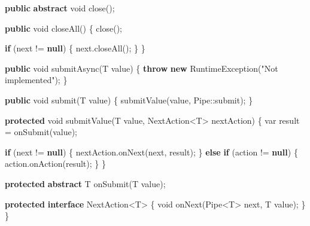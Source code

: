 \documentclass[11pt]{article}
\newenvironment{Shaded}{}{}
\newcommand{\KeywordTok}[1]{\textcolor[rgb]{0.00,0.44,0.13}{\textbf{{#1}}}}
\newcommand{\DataTypeTok}[1]{\textcolor[rgb]{0.56,0.13,0.00}{{#1}}}
\newcommand{\StringTok}[1]{\textcolor[rgb]{0.25,0.44,0.63}{{#1}}}
\newcommand{\FunctionTok}[1]{\textcolor[rgb]{0.02,0.16,0.49}{{#1}}}
\newcommand{\NormalTok}[1]{{#1}}
\newcommand{\ControlFlowTok}[1]{\textcolor[rgb]{0.00,0.44,0.13}{\textbf{{#1}}}}
\newcommand{\OperatorTok}[1]{\textcolor[rgb]{0.40,0.40,0.40}{{#1}}}
\newcommand{\BuiltInTok}[1]{{#1}}
\begin{document}
\begin{Shaded}
\begin{Highlighting}[]
    \KeywordTok{public} \KeywordTok{abstract} \DataTypeTok{void} \FunctionTok{close}\OperatorTok{();}

    \KeywordTok{public} \DataTypeTok{void} \FunctionTok{closeAll}\OperatorTok{()} \OperatorTok{\{}
        \FunctionTok{close}\OperatorTok{();}

        \ControlFlowTok{if} \OperatorTok{(}\NormalTok{next }\OperatorTok{!=} \KeywordTok{null}\OperatorTok{)} \OperatorTok{\{}
\NormalTok{            next}\OperatorTok{.}\FunctionTok{closeAll}\OperatorTok{();}
        \OperatorTok{\}}
    \OperatorTok{\}}

    \KeywordTok{public} \DataTypeTok{void} \FunctionTok{submitAsync}\OperatorTok{(}\NormalTok{T value}\OperatorTok{)} \OperatorTok{\{}
        \ControlFlowTok{throw} \KeywordTok{new} \BuiltInTok{RuntimeException}\OperatorTok{(}\StringTok{"Not implemented"}\OperatorTok{);}
    \OperatorTok{\}}

    \KeywordTok{public} \DataTypeTok{void} \FunctionTok{submit}\OperatorTok{(}\NormalTok{T value}\OperatorTok{)} \OperatorTok{\{}
        \FunctionTok{submitValue}\OperatorTok{(}\NormalTok{value}\OperatorTok{,} \BuiltInTok{Pipe}\OperatorTok{::}\NormalTok{submit}\OperatorTok{);}
    \OperatorTok{\}}

    \KeywordTok{protected} \DataTypeTok{void} \FunctionTok{submitValue}\OperatorTok{(}\NormalTok{T value}\OperatorTok{,}\NormalTok{ NextAction}\OperatorTok{\textless{}}\NormalTok{T}\OperatorTok{\textgreater{}}\NormalTok{ nextAction}\OperatorTok{)} \OperatorTok{\{}
        \DataTypeTok{var}\NormalTok{ result }\OperatorTok{=} \FunctionTok{onSubmit}\OperatorTok{(}\NormalTok{value}\OperatorTok{);}

        \ControlFlowTok{if} \OperatorTok{(}\NormalTok{next }\OperatorTok{!=} \KeywordTok{null}\OperatorTok{)} \OperatorTok{\{}
\NormalTok{            nextAction}\OperatorTok{.}\FunctionTok{onNext}\OperatorTok{(}\NormalTok{next}\OperatorTok{,}\NormalTok{ result}\OperatorTok{);}
        \OperatorTok{\}} \ControlFlowTok{else} \ControlFlowTok{if} \OperatorTok{(}\NormalTok{action }\OperatorTok{!=} \KeywordTok{null}\OperatorTok{)} \OperatorTok{\{}
\NormalTok{            action}\OperatorTok{.}\FunctionTok{onAction}\OperatorTok{(}\NormalTok{result}\OperatorTok{);}
        \OperatorTok{\}}
    \OperatorTok{\}}

    \KeywordTok{protected} \KeywordTok{abstract}\NormalTok{ T }\FunctionTok{onSubmit}\OperatorTok{(}\NormalTok{T value}\OperatorTok{);}

    \KeywordTok{protected} \KeywordTok{interface}\NormalTok{ NextAction}\OperatorTok{\textless{}}\NormalTok{T}\OperatorTok{\textgreater{}} \OperatorTok{\{}
        \DataTypeTok{void} \FunctionTok{onNext}\OperatorTok{(}\BuiltInTok{Pipe}\OperatorTok{\textless{}}\NormalTok{T}\OperatorTok{\textgreater{}}\NormalTok{ next}\OperatorTok{,}\NormalTok{ T value}\OperatorTok{);}
    \OperatorTok{\}}
\OperatorTok{\}}
\end{Highlighting}
\end{Shaded}
\end{document}
